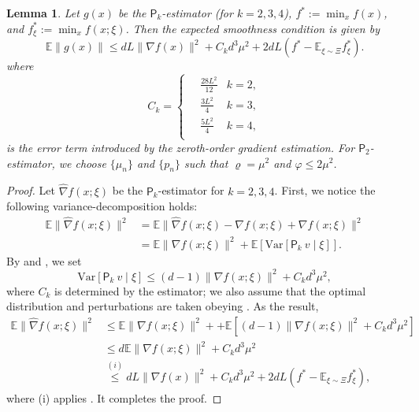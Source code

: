 \documentclass{article}
\newcommand{\Var}{\mathrm{Var}}
\newcommand{\EE}{\mathbb{E}}
\theoremstyle{definition}
\theoremstyle{plain}
\newtheorem{lemma}[definition]{Lemma}
\theoremstyle{remark}
\newcommand{\sfP}{\mathsf{P}}
\begin{document}
\begin{lemma}\label{lemma:2}
    Let $g(x)$ be the $\sfP_k$-estimator (for $k=2,3,4$), $f^*:=\min_{x} f(x)$, and $f^*_\xi:=\min_{x} f(x;\xi)$. Then the expected smoothness condition is given by
    $$\EE \|g(x) \| \leq d L \|\nabla f(x)\|^2 +  C_k d^3 \mu^2 + 2dL (f^* - \EE_{\xi\sim\Xi} f^*_\xi).$$
    where $$C_k =\begin{cases}
        \quad \frac{28L^2}{12} &k=2, \\ 
        \quad \frac{3L^2}{4}   &k=3, \\
        \quad \frac{5L^2}{4}  &k=4, \\
    \end{cases}$$
    is the error term introduced by the zeroth-order gradient estimation. For $\sfP_2$-estimator, we choose $\{\mu_n\}$ and $\{p_n\}$ such that $\varrho=\mu^2$ and $\varphi\leq 2\mu^2$. 
\end{lemma}
\begin{proof}
    Let $\hat{\nabla} f(x;\xi)$ be the $\sfP_k$-estimator for $k=2,3,4$. First, we notice the following variance-decomposition holds: 
    \begin{align*}
        \EE \| \hat{\nabla} f(x;\xi) \|^2 &=  \EE \| \hat{\nabla} f(x;\xi)  - \nabla f(x;\xi) + \nabla f(x;\xi)\|^2 \\ 
        &= \EE \| \nabla f(x;\xi) \|^2 + \EE \left[ \Var\left[  \sfP_k \ v \mid \xi\right] \right].
    \end{align*}
    By  and , we set 
    $$\Var\left[  \sfP_k \ v \mid \xi\right]  \leq (d-1) \|\nabla f(x;\xi) \|^2 + C_k d^3 \mu^2,$$
    where $C_k$ is determined by the estimator; we also assume that the optimal distribution and perturbations are taken obeying . As the result,
    \begin{align*}
        \EE \| \hat{\nabla} f(x;\xi) \|^2  &\leq  \EE \| \nabla f(x;\xi) \|^2 +  + \EE \left[ (d-1) \|\nabla f(x;\xi) \|^2 + C_k d^3 \mu^2\right] \\ 
        &\leq d \EE \| \nabla f(x;\xi) \|^2 +  C_k d^3 \mu^2 \\ 
        &\overset{(i)}{\leq }d L \|\nabla f(x)\|^2 +  C_k d^3 \mu^2 + 2dL (f^* - \EE_{\xi\sim\Xi} f^*_\xi),
    \end{align*}
    where (i) applies . It completes the proof.
\end{proof}
\end{document}

